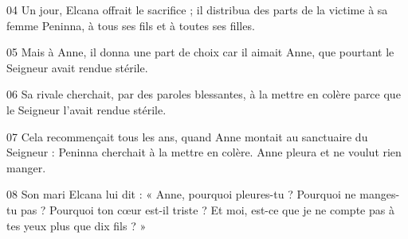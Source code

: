 
04 Un jour, Elcana offrait le sacrifice ; il distribua des parts de la victime à sa femme Peninna, à tous ses fils et à toutes ses filles.

05 Mais à Anne, il donna une part de choix car il aimait Anne, que pourtant le Seigneur avait rendue stérile.

06 Sa rivale cherchait, par des paroles blessantes, à la mettre en colère parce que le Seigneur l’avait rendue stérile.

07 Cela recommençait tous les ans, quand Anne montait au sanctuaire du Seigneur : Peninna cherchait à la mettre en colère. Anne pleura et ne voulut rien manger.

08 Son mari Elcana lui dit : « Anne, pourquoi pleures-tu ? Pourquoi ne manges-tu pas ? Pourquoi ton cœur est-il triste ? Et moi, est-ce que je ne compte pas à tes yeux plus que dix fils ? »
